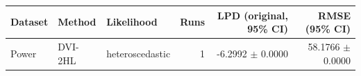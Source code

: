 \begin{tabular}{lllrrr}
\toprule
Dataset & Method & Likelihood & Runs & LPD (original, 95\% CI) & RMSE (95\% CI) \\
\midrule
Power & DVI-2HL & heteroscedastic & 1 & -6.2992 $\pm$ 0.0000 & 58.1766 $\pm$ 0.0000 \\
\bottomrule
\end{tabular}
